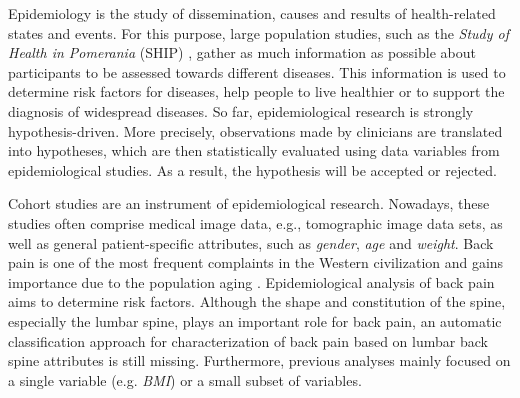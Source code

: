 \documentclass[a4paper,twoside]{style/article}
\begin{document}
\noindent Epidemiology is the study of dissemination, causes and results of health-related states and events.
For this purpose, large population studies, such as the \emph{Study of Health in Pomerania} (SHIP) \cite{SHIP}, gather as much information as possible about participants to be assessed towards different diseases.
This information is used to determine risk factors for diseases, help people to live healthier or to support the diagnosis of widespread diseases.
So far, epidemiological research is strongly hypothesis-driven.
More precisely, observations made by clinicians are translated into hypotheses, which are then statistically evaluated using data variables from epidemiological studies.
As a result, the hypothesis will be accepted or rejected.

Cohort studies are an instrument of epidemiological research.
Nowadays, these studies often comprise medical image data, e.g., tomographic image data sets, as well as general patient-specific attributes, such as \emph{gender}, \emph{age} and \emph{weight}.
Back pain is one of the most frequent complaints in the Western civilization and gains importance due to the population aging \cite{Hoy2010}.
Epidemiological analysis of back pain aims to determine risk factors.
Although the shape and constitution of the spine, especially the lumbar spine, plays an important role for back pain, an automatic classification approach for characterization of back pain based on lumbar back spine attributes is still missing.
Furthermore, previous analyses mainly focused on a single variable (e.g. \emph{BMI}) or a small subset of variables.
\end{document}

